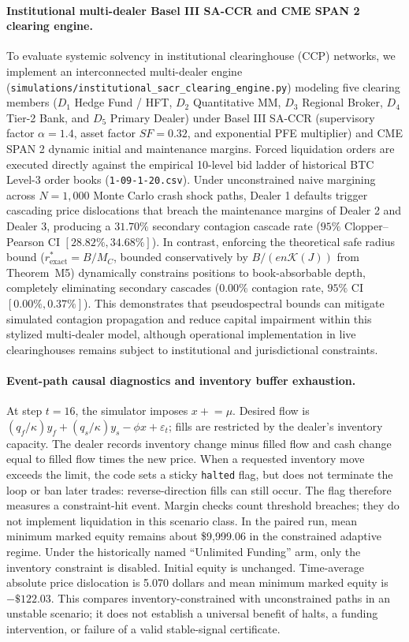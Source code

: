 \documentclass[10pt,twocolumn,letterpaper]{article}
\theoremstyle{definition}
\theoremstyle{remark}
\begin{document}
\paragraph{Institutional multi-dealer Basel III SA-CCR and CME SPAN 2 clearing engine.}
To evaluate systemic solvency in institutional clearinghouse (CCP) networks, we implement an interconnected multi-dealer engine (\texttt{simulations/institutional\_sacr\_clearing\_engine.py}) modeling five clearing members ($D_1$ Hedge Fund / HFT, $D_2$ Quantitative MM, $D_3$ Regional Broker, $D_4$ Tier-2 Bank, and $D_5$ Primary Dealer) under Basel III SA-CCR (supervisory factor $\alpha = 1.4$, asset factor $SF = 0.32$, and exponential PFE multiplier) and CME SPAN 2 dynamic initial and maintenance margins. Forced liquidation orders are executed directly against the empirical 10-level bid ladder of historical BTC Level-3 order books (\texttt{1-09-1-20.csv}). Under unconstrained naive margining across $N = 1{,}000$ Monte Carlo crash shock paths, Dealer 1 defaults trigger cascading price dislocations that breach the maintenance margins of Dealer 2 and Dealer 3, producing a $31.70\%$ secondary contagion cascade rate ($95\%$ Clopper--Pearson CI $[28.82\%, 34.68\%]$). In contrast, enforcing the theoretical safe radius bound ($r^*_{\text{exact}} = B / M_C$, bounded conservatively by $B / (e n \mathcal{K}(J))$ from Theorem~M5) dynamically constrains positions to book-absorbable depth, completely eliminating secondary cascades ($0.00\%$ contagion rate, $95\%$ CI $[0.00\%, 0.37\%]$). This demonstrates that pseudospectral bounds can mitigate simulated contagion propagation and reduce capital impairment within this stylized multi-dealer model, although operational implementation in live clearinghouses remains subject to institutional and jurisdictional constraints.

\paragraph{Event-path causal diagnostics and inventory buffer exhaustion.}
At step $t=16$, the simulator imposes $x\mathrel{+}=\mu$. Desired flow is $(q_f/\kappa)y_f+(q_s/\kappa)y_s-\phi x+\varepsilon_t$; fills are restricted by the dealer's inventory capacity. The dealer records inventory change minus filled flow and cash change equal to filled flow times the new price. When a requested inventory move exceeds the limit, the code sets a sticky \texttt{halted} flag, but does not terminate the loop or ban later trades: reverse-direction fills can still occur. The flag therefore measures a constraint-hit event. Margin checks count threshold breaches; they do not implement liquidation in this scenario class. In the paired run, mean minimum marked equity remains about \$9,999.06 in the constrained adaptive regime.
Under the historically named ``Unlimited Funding'' arm, only the inventory constraint is disabled. Initial equity is unchanged. Time-average absolute price dislocation is 5.070 dollars and mean minimum marked equity is $-\$122.03$. This compares inventory-constrained with unconstrained paths in an unstable scenario; it does not establish a universal benefit of halts, a funding intervention, or failure of a valid stable-signal certificate.
\end{document}
